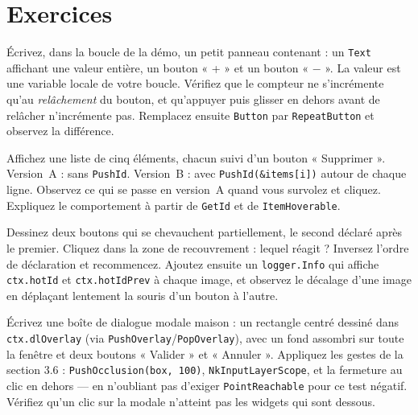 \section{Exercices}

\begin{nkpratique}[1 — Le compteur]
Écrivez, dans la boucle de la démo, un petit panneau contenant : un
\texttt{Text} affichant une valeur entière, un bouton « + » et un bouton
« $-$ ». La valeur est une variable locale de votre boucle. Vérifiez que le
compteur ne s'incrémente qu'au \emph{relâchement} du bouton, et qu'appuyer puis
glisser en dehors avant de relâcher n'incrémente pas. Remplacez ensuite
\texttt{Button} par \texttt{RepeatButton} et observez la différence.
\end{nkpratique}

\begin{nkdemo}
Affichez une liste de cinq éléments, chacun suivi d'un bouton « Supprimer ».
Version~A : sans \texttt{PushId}. Version~B : avec \texttt{PushId(\&items[i])}
autour de chaque ligne. Observez ce qui se passe en version~A quand vous
survolez et cliquez. Expliquez le comportement à partir de \texttt{GetId} et de
\texttt{ItemHoverable}.
\end{nkdemo}

\begin{nklogique}
Dessinez deux boutons qui se chevauchent partiellement, le second déclaré après
le premier. Cliquez dans la zone de recouvrement : lequel réagit ? Inversez
l'ordre de déclaration et recommencez. Ajoutez ensuite un \texttt{logger.Info}
qui affiche \texttt{ctx.hotId} et \texttt{ctx.hotIdPrev} à chaque image, et
observez le décalage d'une image en déplaçant lentement la souris d'un bouton à
l'autre.
\end{nklogique}

\begin{nkpratique}
Écrivez une boîte de dialogue modale maison : un rectangle centré dessiné dans
\texttt{ctx.dlOverlay} (via \texttt{PushOverlay}/\texttt{PopOverlay}), avec un
fond assombri sur toute la fenêtre et deux boutons « Valider » et « Annuler ».
Appliquez les gestes de la section 3.6 : \texttt{PushOcclusion(box, 100)},
\texttt{NkInputLayerScope}, et la fermeture au clic en dehors — en n'oubliant
pas d'exiger \texttt{PointReachable} pour ce test négatif. Vérifiez qu'un clic
sur la modale n'atteint pas les widgets qui sont dessous.
\end{nkpratique}

